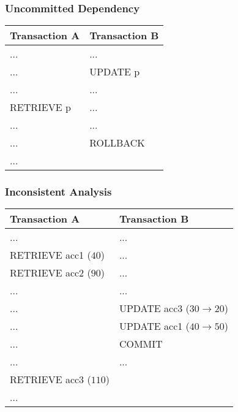 \documentclass[dvipsnames]{beamer}
\theoremstyle{plain}
\begin{document}
\begin{frame}[fragile]
  \frametitle{Uncommitted Dependency}

  \begin{example}
    \begin{table}
      \begin{tabular}{ll}
Transaction A & Transaction B\\\hline
...           & ...          \\\pause
...           & UPDATE p     \\\pause
...           & ...          \\
RETRIEVE p    & ...          \\\pause
...           & ...          \\
...           & ROLLBACK     \\
...           &
      \end{tabular}
    \end{table}
  \end{example}
\end{frame}

\begin{frame}[fragile]
  \frametitle{Inconsistent Analysis}

  \begin{example}[sum of accounts: acc1=40, acc2=50, acc3=30]
    \begin{table}
      \begin{tabular}{ll}
Transaction A         & Transaction B                    \\\hline
...                   & ...                              \\\pause
RETRIEVE acc1 ($40$)  & ...                              \\\pause
RETRIEVE acc2 ($90$)  & ...                              \\\pause
...                   & ...                              \\
...                   & UPDATE acc3 ($30 \rightarrow 20$)\\
...                   & UPDATE acc1 ($40 \rightarrow 50$)\\
...                   & COMMIT                           \\\pause
...                   & ...                              \\
RETRIEVE acc3 ($110$) &                                  \\
...                   &
      \end{tabular}
    \end{table}
  \end{example}
\end{frame}
\end{document}
